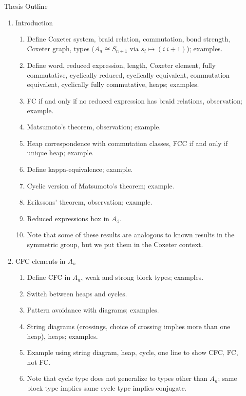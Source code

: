 \documentclass{article}
\begin{document}
\begin{center} Thesis Outline \end{center}
\begin{enumerate}

\item Introduction \begin{enumerate}
    \item Define Coxeter system, braid relation, commutation, bond strength, Coxeter graph, types ($A_n \cong S_{n+1}$ via $s_i \mapsto (i \ i+1)$); examples.
    \item Define word, reduced expression, length, Coxeter element, fully commutative, cyclically reduced, cyclically equivalent, commutation equivalent, cyclically fully commutative, heaps; examples.
    \item FC if and only if no reduced expression has braid relations, observation; example.
    \item Matsumoto's theorem, observation; example.
    \item Heap correspondence with commutation classes, FCC if and only if unique heap; example.
    \item Define kappa-equivalence; example.
    \item Cyclic version of Matsumoto's theorem; example.
    \item Erikssons' theorem, observation; example.
    \item Reduced expressions box in $A_4$.
    \item Note that some of these results are analogous to known results in the symmetric group, but we put them in the Coxeter context.
\end{enumerate}

\item CFC elements in $A_n$ \begin{enumerate}
	\item Define CFC in $A_n$, weak and strong block types; examples.
	\item Switch between heaps and cycles.
	\item Pattern avoidance with diagrams; examples.
	\item String diagrams (crossings, choice of crossing implies more than one heap), heaps; examples.
	\item Example using string diagram, heap, cycle, one line to show CFC, FC, not FC.
	\item Note that cycle type does not generalize to types other than $A_n$; same block type implies same cycle type implies conjugate.
\end{enumerate}


\end{enumerate}
\end{document}
